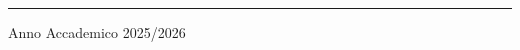 \begin{titlepage}
\begin{flushright}
    \end{flushright}

 
    \vspace*{5mm}

    \rule{0.8\textwidth}{0.4pt}
    \begin{center}
    {\fontsize{17}{17}\selectfont 
        Anno Accademico 2025/2026
    }
    \end{center}
    
    
\end{titlepage}
\restoregeometry
